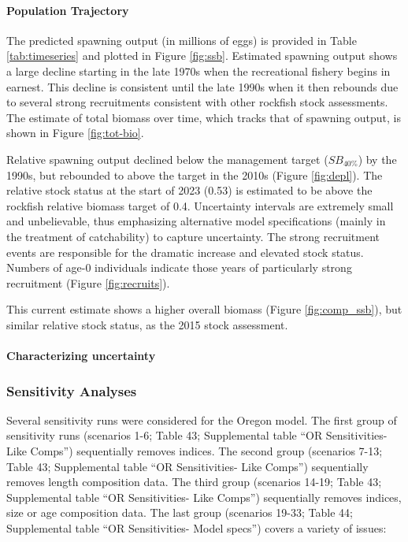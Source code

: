 \documentclass[11pt,
  english,
  letterpaper,
]{article}
\begin{document}
\hypertarget{population-trajectory}{%
\paragraph{Population Trajectory}\label{population-trajectory}}

The predicted spawning output (in millions of eggs) is provided in Table \ref{tab:timeseries} and plotted in Figure \ref{fig:ssb}. Estimated spawning output shows a large decline starting in the late 1970s when the recreational fishery begins in earnest. This decline is consistent until the late 1990s when it then rebounds due to several strong recruitments consistent with other rockfish stock assessments. The estimate of total biomass over time, which tracks that of spawning output, is shown in Figure \ref{fig:tot-bio}.

Relative spawning output declined below the management target (\(SB_{40\%}\)) by the 1990s, but rebounded to above the target in the 2010s (Figure \ref{fig:depl}). The relative stock status at the start of 2023 (0.53) is estimated to be above the rockfish relative biomass target of 0.4. Uncertainty intervals are extremely small and unbelievable, thus emphasizing alternative model specifications (mainly in the treatment of catchability) to capture uncertainty. The strong recruitment events are responsible for the dramatic increase and elevated stock status. Numbers of age-0 individuals indicate those years of particularly strong recruitment (Figure \ref{fig:recruits}).

This current estimate shows a higher overall biomass (Figure \ref{fig:comp_ssb}), but similar relative stock status, as the 2015 stock assessment.

\hypertarget{characterizing-uncertainty}{%
\paragraph{Characterizing uncertainty}\label{characterizing-uncertainty}}

\hypertarget{sensitivity-analyses}{%
\subsubsection{Sensitivity Analyses}\label{sensitivity-analyses}}

Several sensitivity runs were considered for the Oregon model. The first group of sensitivity runs (scenarios 1-6; Table 43; Supplemental table ``OR Sensitivities- Like Comps'') sequentially removes indices. The second group (scenarios 7-13; Table 43; Supplemental table ``OR Sensitivities- Like Comps'') sequentially removes length composition data. The third group (scenarios 14-19; Table 43; Supplemental table ``OR Sensitivities- Like Comps'') sequentially removes indices, size or age composition data. The last group (scenarios 19-33; Table 44; Supplemental table ``OR Sensitivities- Model specs'') covers a variety of issues:
\end{document}
